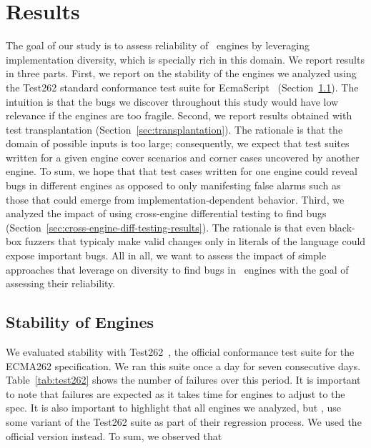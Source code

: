 \documentclass[10pt,conference,anonymous]{IEEEtran}
\begin{document}
\section{Results}
\label{sec:results}

The goal of our study is to assess reliability of \js\ engines by
leveraging implementation diversity, which is specially rich in this
domain. We report results in three parts. First, we report on the
stability of the engines we analyzed using the Test262 standard
conformance test suite for EcmaScript~\cite{ecma262-conformance-suite}
(Section~\ref{sec:stability}). The intuition is that the bugs we
discover throughout this study would have low relevance if the engines
are too fragile. Second, we report results obtained with test
transplantation (Section~\ref{sec:transplantation}). The rationale is
that the domain of possible inputs is too large; consequently, we
expect that test suites written for a given engine cover scenarios and
corner cases uncovered by another engine. To sum, we hope that that
test cases written for one engine could reveal bugs in different
engines as opposed to only manifesting false alarms such as those that
could emerge from implementation-dependent behavior. Third, we
analyzed the impact of using cross-engine differential testing to find
bugs (Section~\ref{sec:cross-engine-diff-testing-results}). The
rationale is that even black-box fuzzers that typicaly make valid
changes only in literals of the language could expose important
bugs. All in all, we want to assess the impact of simple approaches
that leverage on diversity to find bugs in \js\ engines with the goal
of assessing their reliability.

\subsection{Stability of Engines}
\label{sec:stability}

We evaluated stability with Test262~\cite{ecma262-conformance-suite},
the official \js{} conformance test suite for the ECMA262
specification. We ran this suite once a day for seven consecutive
days. Table~\ref{tab:test262} shows the number of failures over this
period. It is important to note that failures are expected as it takes
time for engines to adjust to the spec. It is also important to
highlight that all engines we analyzed, but \chakra{}, use some
variant of the Test262 suite as part of their regression
process. We used the official version
instead. To sum, we observed
that  
\end{document}
